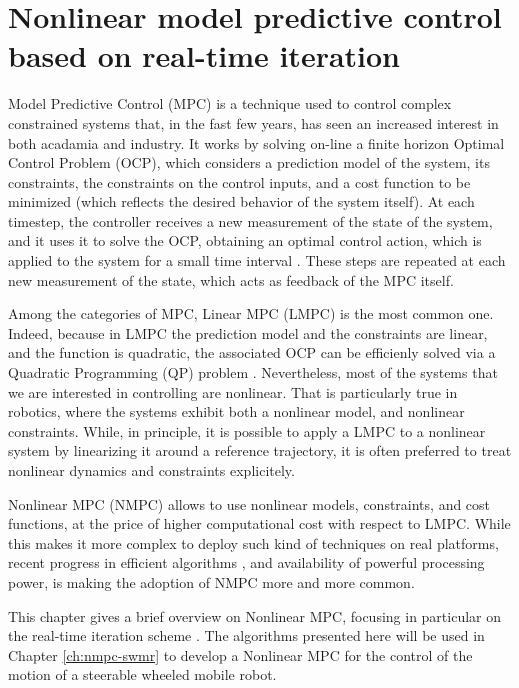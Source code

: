 \chapter{Nonlinear model predictive control based on real-time iteration}
Model Predictive Control (MPC) is a technique used to control complex 
constrained systems that, in the fast few years, has seen an increased
interest in both acadamia and industry. It works by solving on-line a
finite horizon Optimal Control Problem (OCP), which considers a prediction 
model of the system, its constraints, the constraints on the
control inputs, and a cost function to be minimized (which reflects the
desired behavior of the system itself).
At each timestep, the controller receives a new measurement of the state of 
the system, and it uses it to solve the OCP, obtaining an optimal control action,
which is applied to the system for a small time interval
\cite{Mayne2014MPCAutomatica}. These steps are repeated at each new measurement 
of the state, which acts as feedback of the MPC itself.

Among the categories of MPC, Linear MPC (LMPC) is the most common one.
Indeed, because in LMPC the prediction model and the constraints are linear,
and the function is quadratic, the associated OCP can be efficienly solved
via a Quadratic Programming (QP) problem \cite{Gros2020Fromlineartononlinear}. 
Nevertheless, most of the systems that we are interested in controlling are 
nonlinear. That is particularly true in robotics, where the systems exhibit
both a nonlinear model, and nonlinear constraints. While, in principle, it is 
possible to apply a LMPC to a nonlinear system by linearizing it around a 
reference trajectory, it is often preferred to treat nonlinear dynamics and 
constraints explicitely.

Nonlinear MPC (NMPC) \cite{Diehl2009EfficientNumericalMethodsNMPC} allows to use 
nonlinear models, constraints, and cost functions, at the price of higher 
computational cost with respect to LMPC. While this makes it more complex to 
deploy such kind of techniques on real platforms, recent progress in efficient
algorithms \cite{Diehl2005RTI}, and availability of powerful processing power,
is making the adoption of NMPC more and more common.

This chapter gives a brief overview on Nonlinear MPC, focusing in particular on
the real-time iteration scheme \cite{Gros2020Fromlineartononlinear}. The 
algorithms presented here will be used in Chapter \ref{ch:nmpc-swmr} to develop 
a Nonlinear MPC for the control of the motion of a steerable wheeled mobile 
robot.

